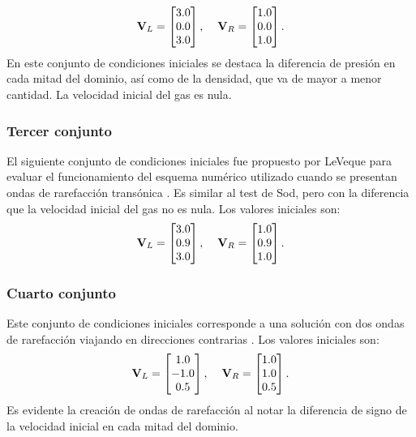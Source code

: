 \begin{equation}
\mathbf{V}_L = 
	\begin{bmatrix}
		3.0\\
		0.0\\
		3.0
	\end{bmatrix},\hspace{4mm}
\mathbf{V}_R = 
	\begin{bmatrix}
		1.0\\
		0.0\\
		1.0
	\end{bmatrix}.
\end{equation}
En este conjunto de condiciones iniciales se destaca la diferencia de presión en cada mitad del dominio, así como de la densidad, que va de mayor a menor cantidad. La velocidad inicial del gas es nula.

\subsubsection{Tercer conjunto}
\label{sec:leveque_sin_entropy714}
El siguiente conjunto de condiciones iniciales fue propuesto por LeVeque para evaluar el funcionamiento del esquema numérico utilizado cuando se presentan ondas de rarefacción transónica \cite{pelanti}. Es similar al test de Sod, pero con la diferencia que la velocidad inicial del gas no es nula. Los valores iniciales son:
\begin{equation}
	\mathbf{V}_L = 
	\begin{bmatrix}
		3.0\\
		0.9\\
		3.0
	\end{bmatrix},\hspace{4mm}
	\mathbf{V}_R = 
	\begin{bmatrix}
		1.0\\
		0.9\\
		1.0
	\end{bmatrix}.
\end{equation}
\subsubsection{Cuarto conjunto}
\label{sec:tercer-conjunto}
Este conjunto de condiciones iniciales corresponde a una solución con dos ondas de rarefacción viajando en direcciones contrarias \cite{thesis-euler-godunov}. Los valores iniciales son:
\begin{equation}
	\mathbf{V}_L = 
	\begin{bmatrix}
		1.0\\
		-1.0\\
		0.5
	\end{bmatrix},\hspace{4mm}
	\mathbf{V}_R = 
	\begin{bmatrix}
		1.0\\
		1.0\\
		0.5
	\end{bmatrix}.
\end{equation}
Es evidente la creación de ondas de rarefacción al notar la diferencia de signo de la velocidad inicial en cada mitad del dominio.

